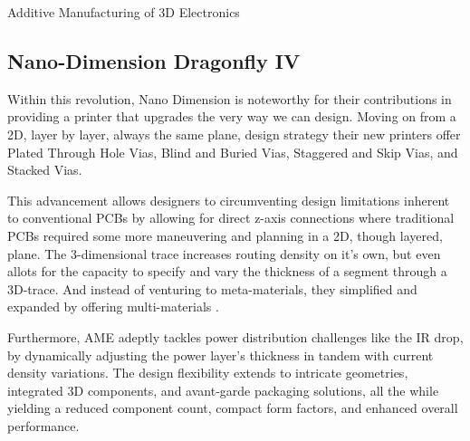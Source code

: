 \documentclass[12pt]{article}
\begin{document}
\begin{section} {Additive Manufacturing of 3D Electronics}
\subsection{Nano-Dimension Dragonfly IV}

Within this revolution, Nano Dimension is noteworthy for their contributions in providing a printer that upgrades the very way we can design.  Moving on from a 2D, layer by layer, always the same plane, design strategy their new printers offer Plated Through Hole Vias, Blind and Buried Vias, Staggered and Skip Vias, and Stacked Vias.

This advancement allows designers to circumventing design limitations inherent to conventional PCBs by allowing for direct z-axis connections where traditional PCBs required some more maneuvering and planning in a 2D, though layered, plane.
The 3-dimensional trace increases routing density on it's own, but even allots for the capacity to specify and vary the thickness of a segment through a 3D-trace. And instead of venturing to meta-materials, they simplified and expanded by offering multi-materials \cite{__2022}.

Furthermore, AME adeptly tackles power distribution challenges like the IR drop, by dynamically adjusting the power layer's thickness in tandem with current density variations. The design flexibility extends to intricate geometries, integrated 3D components, and avant-garde packaging solutions, all the while yielding a reduced component count, compact form factors, and enhanced overall performance.

\end{section}
\end{document}
